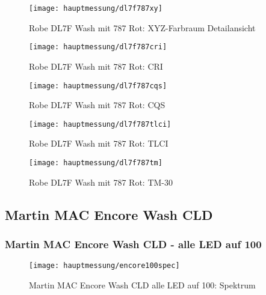 \documentclass[pagesize,paper=A4,fontsize=12pt,utf8,numbers=noenddot,bibliography=totoc,listof=totoc,DIV=11,BCOR=1mm]{scrreprt}
\begin{document}
\begin{figure}[htp]     %
\centering
\texttt{[image: hauptmessung/dl7f787xy]} 
\caption { Robe DL7F Wash mit 787 Rot: XYZ-Farbraum Detailansicht} 
\end{figure}

\begin{figure}[htp]     %
\centering
\texttt{[image: hauptmessung/dl7f787cri]} 
\caption { Robe DL7F Wash mit 787 Rot: CRI} 
\end{figure}

\begin{figure}[htp]     %
\centering
\texttt{[image: hauptmessung/dl7f787cqs]} 
\caption { Robe DL7F Wash mit 787 Rot: CQS} 
\end{figure}

\begin{figure}[htp]     %
\centering
\texttt{[image: hauptmessung/dl7f787tlci]} 
\caption { Robe DL7F Wash mit 787 Rot: TLCI} 
\end{figure}

\begin{figure}[htp]     %
\centering
\texttt{[image: hauptmessung/dl7f787tm]} 
\caption { Robe DL7F Wash mit 787 Rot: TM-30} 
\end{figure}


\subsection{Martin MAC Encore Wash CLD}

\subsubsection{Martin MAC Encore Wash CLD - alle LED auf 100}

\begin{figure}[htp]     %
\centering
\texttt{[image: hauptmessung/encore100spec]} 
\caption {Martin MAC Encore Wash CLD alle LED auf 100: Spektrum} 
\end{figure}
\end{document}
